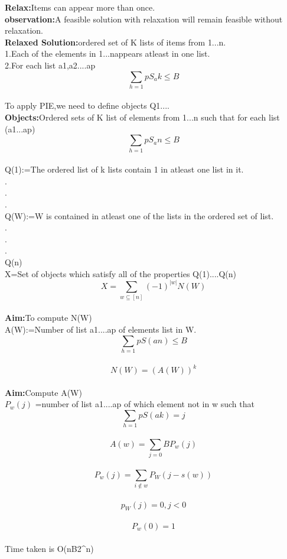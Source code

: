 \textbf{Relax:}Items can appear more than once.\\
\textbf{observation:}A feasible solution with relaxation will remain feasible without relaxation.\\
\textbf{Relaxed Solution:}ordered set of K lists of items from {1...n}.\\
1.Each of the elements in {1...n}appears atleast in one list.\\
2.For each list a1,a2....ap
$$\sum_{h=1}{p}S_ak \leq B $$\\
To apply PIE,we need to define objects Q1....\\
\textbf{Objects:}Ordered sets of K list of elements from {1...n} such that for each list (a1...ap) $$\sum_{h=1}{p}S_an \leq B $$\\
Q(1):=The ordered list of k lists contain 1 in atleast one list in it.\\
.\\
.\\
.\\
Q(W):=W  is contained in atleast one of the lists in the ordered set of list.\\
.\\
.\\
.\\
Q(n)\\
X=Set of objects which satisfy all of the properties Q(1)....Q(n)\\
$$X=\sum_{w \subseteq [n]}(-1)^{|w|} N(W) $$\\
\textbf{Aim:}To compute N(W)\\
A(W):=Number of list a1....ap of elements list in W.\\
$$ \sum_{h=1}{p}S(an) \leq B $$\\
$$N(W)=(A(W))^{k}  $$\\
\textbf{Aim:}Compute A(W)\\
$P_w(j)$ =number of list a1....ap of which element not in w such that
$$\sum_{h=1}{p}S(ak)=j  $$\\
$$A(w)=\sum_{j=0}{B}P_w(j)$$\\
$$P_w(j)=\sum_{i \notin w}P_W(j-s(w)) $$\\
$$ p_W(j)=0, j<0 $$\\
$$P_w(0)=1 $$\\
Time taken is O(nB2^{n})





